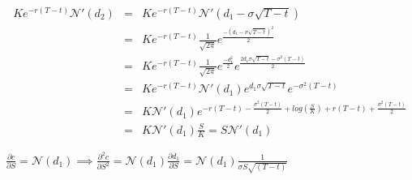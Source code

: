 \documentclass[11pt, fleqn]{article}
\begin{document}
\begin{eqnarray*}
Ke^{-r(T-t)}\mathcal{N}'(d_2) &=& Ke^{-r(T-t)}\mathcal{N}'(d_1 - \sigma\sqrt{T-t})\\
&=& Ke^{-r(T-t)}\frac{1}{\sqrt{2\pi}}e^{\frac{-(d_1 - \sigma\sqrt{T-t})^2}{2}}\\
&=& Ke^{-r(T-t)}\frac{1}{\sqrt{2\pi}}e^{\frac{-d_1^2}{2}}e^{\frac{2d_1\sigma\sqrt{T-t} - \sigma^2(T-t)}{2}}\\
&=& Ke^{-r(T-t)}\mathcal{N}'(d_1)e^{d_1\sigma\sqrt{T-t}}e^{-\sigma^2(T-t)}\\
&=& K\mathcal{N}'(d_1)e^{-r(T-t)-\frac{\sigma^2(T-t)}{2} + log(\frac{S}{K}) + r(T-t) + \frac{\sigma^2(T-t)}{2}}\\
&=& K\mathcal{N}'(d_1)\frac{S}{K} = S\mathcal{N}'(d_1)
\end{eqnarray*}


$
\frac{\partial c}{\partial S} = \mathcal{N}(d_1)
\implies \frac{\partial^2 c}{\partial S^2} = \mathcal{N}(d_1)\frac{\partial d_1}{\partial S} = \mathcal{N}(d_1)\frac{1}{\sigma S \sqrt{(T-t)}}
$
\end{document}
